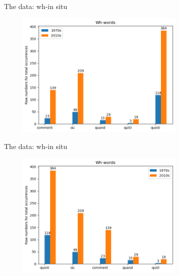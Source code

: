 \documentclass[lesson_slides]{subfiles}
\begin{document}
\begin{frame}[c]{The data: wh-in situ}

    \begin{center}
       \includegraphics[width=10cm, height=6cm]{images/insituraw.png} 
    \end{center}
  
\end{frame}
\begin{frame}[c]{The data: wh-in situ}

    \begin{center}
       \includegraphics[width=10cm, height=6cm]{images/insituraw2.png} 
    \end{center}
  
\end{frame}
\end{document}
